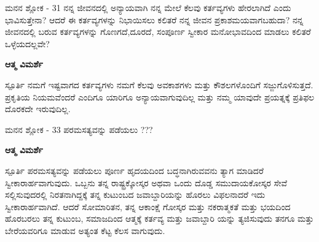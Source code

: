 \begin{mananam}{\kanfont ಮನನ ಶ್ಲೋಕ - \textenglish{31}}
\footnotesize \mananamfont ನನ್ನ ಜೀವನದಲ್ಲಿ ಅನ್ಯಾಯವಾಗಿ ನನ್ನ ಮೇಲೆ ಕೆಲವು ಕರ್ತವ್ಯಗಳು ಹೇರಲಾಗಿದೆ ಎಂದು ಭಾವಿಸುತ್ತೇನಾ? ಆದರೆ ಈ ಕರ್ತವ್ಯಗಳನ್ನು ನಿಭಾಯಿಸಲು ಕಲಿತರೆ ನನ್ನ ಜೀವನ ಪ್ರಕಾಶಮಯವಾಗಬಹುದಾ? ನನ್ನ ಜೀವನದಲ್ಲಿ ಬರುವ ಕರ್ತವ್ಯಗಳನ್ನು ಗೊಣಗದೆ,ದೂರದೆ, ಸಂಪೂರ್ಣ ಸ್ವೀಕಾರ ಮನೋಭಾವದಿಂದ ಮಾಡಲು ಕಲಿತರೆ ಒಳ್ಳೆಯದಲ್ಲವೇ?
\end{mananam}
\WritingHand\enspace\textbf{ಆತ್ಮ ವಿಮರ್ಶೆ}
\begin{inspiration}{\kanfont ಸ್ಪೂರ್ತಿ}
\footnotesize \mananamfont ನಮಗೆ ಇಷ್ಟವಾಗದ ಕರ್ತವ್ಯಗಳು ನಮಗೆ ಕೆಲವು ಅವಕಾಶಗಳು ಮತ್ತು ಕೌಶಲಗಳೊಂದಿಗೆ ಸಜ್ಜುಗೊಳಿಸುತ್ತದೆ. ಪ್ರಕೃತಿಯ ನಿಯಮವೆಂದರೆ ಎಂದಿಗೂ ಯಾರಿಗೂ ಅನ್ಯಾಯವಾಗುವುದಿಲ್ಲ ಮತ್ತು ನಮ್ಮ ಯಾವುದೇ ಪ್ರಯತ್ನಕ್ಕೆ ಪ್ರತಿಫಲ ದೊರಕದೇ ಇರುವುದಿಲ್ಲ.
\end{inspiration}
\newpage

\begin{mananam}{\kanfont ಮನನ ಶ್ಲೋಕ - \textenglish{33}}
\footnotesize \mananamfont ಪರಮಸತ್ಯವನ್ನು ಪಡೆಯಲು ???
\end{mananam}
\WritingHand\enspace\textbf{ಆತ್ಮ ವಿಮರ್ಶೆ}
\begin{inspiration}{\kanfont ಸ್ಪೂರ್ತಿ}
\footnotesize \mananamfont ಪರಮಸತ್ಯವನ್ನು ಪಡೆಯಲು ಪೂರ್ಣ ಹೃದಯದಿಂದ ಬದ್ಧನಾಗಿರುವವನು ತ್ಯಾಗ ಮಾಡಿದರೆ ಸ್ವೀಕಾರಾರ್ಹವಾಗುವುದು. ಒಬ್ಬನು ತನ್ನ ರಾಷ್ಟ್ರಕ್ಕೋಸ್ಕರ ಅಥವಾ ಒಂದು ದೊಡ್ಡ ಸಮುದಾಯಕೋಸ್ಕರ ಸೇವೆ ಸಲ್ಲಿಸುವುದರಲ್ಲಿ ನಿರತನಾಗಿದ್ದಕ್ಕೆ ತನ್ನ ಕುಟುಂಬದ ಜವಾಬ್ದಾರಿಯನ್ನು ಹೊರಲು ವಿಫಲನಾದರೆ ಇದು ಸ್ವೀಕಾರಾರ್ಹವಾಗಿದೆ. ಆದರೆ ಸೋಮಾರಿತನ, ತನ್ನ ಆಕಾಂಕ್ಷೆ ಗೋಸ್ಕರ ಮತ್ತು ನಕರಾತ್ಮಕತೆ ಮತ್ತು ಭಯದಿಂದ ಹೊರಬರಲು ತನ್ನ ಕುಟುಂಬ, ಸಮಾಜದಿಂದ ಆತ್ಮಕ್ಕೆ ಕರ್ತವ್ಯ ಮತ್ತು ಜವಾಬ್ದಾರಿ ಯನ್ನು ತ್ಯಜಿಸುವುದು ತನಗೂ ಮತ್ತು ಬೇರೆಯವರಿಗೂ ಮಾಡುವ ಅತ್ಯಂತ ಕೆಟ್ಟ ಕೆಲಸ ವಾಗುವುದು.
\end{inspiration}
\newpage


